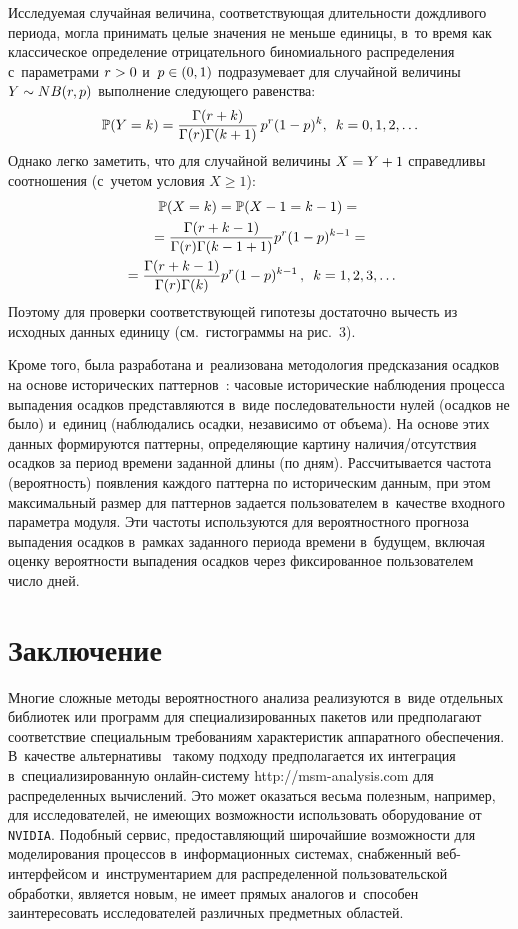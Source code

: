\begin{multicols}{2}
Исследуемая случайная величина, соответствующая длительности 
дождливого периода, могла принимать целые значения не меньше единицы, в~то время 
как классическое определение отрицательного биномиального 
распределения с~па\-ра\-мет\-ра\-ми $r\hm>0$ и~$p\hm\in(0,1)$ подразумевает для 
случайной величины~$Y\hm\sim NB(r,p)$ выполнение следующего равенства:
\begin{equation*}
\mathbb{P}(Y=k)=\displaystyle\frac{\displaystyle \Gamma(r+k)\mathstrut}{\displaystyle \Gamma(r)\Gamma(k+1)\mathstrut}\, p^r (1-p)^{k},
\enskip k=0,1,2,\ldots
\end{equation*}
Однако легко заметить, что для случайной величины $X\hm=Y\hm+1$ справедливы соотношения 
(с~учетом условия $X\geqslant 1$):
\begin{multline*}
\mathbb{P}(X=k)=\mathbb{P}(X-1=k-1)={}\\
{}=\displaystyle\frac{\displaystyle \Gamma(r+k-1)\mathstrut}{\displaystyle \Gamma(r)\Gamma(k-1+1)\mathstrut} p^r
(1-p)^{k-1}={}\\
{}=\displaystyle\frac{\displaystyle \Gamma(r+k-1)\mathstrut}{\displaystyle \Gamma(r)\Gamma(k)\mathstrut} p^r
(1-p)^{k-1}\,, \enskip k=1,2,3,\ldots
\end{multline*}
Поэтому для проверки соответствующей гипотезы достаточно вычесть 
из исходных данных единицу (см.\ гистограммы 
на рис.~3).


Кроме того, была разработана и~реализована методология предсказания осадков 
на основе исторических паттернов~\cite{Gorshenin2016Soft4}: часовые исторические 
наблюдения процесса выпадения осадков представляются в~виде последовательности 
нулей (осадков не было) и~единиц (наблюдались осадки, независимо от объема). 
На основе этих данных формируются паттерны, определяющие картину на\-ли\-чия/от\-сут\-ст\-вия 
осадков за период времени заданной длины (по дням). Рассчитывается частота 
(вероятность) появления каждого паттерна по историческим данным, при этом 
максимальный размер для паттернов задается пользователем в~качестве входного 
параметра модуля. Эти частоты используются для вероятностного прогноза выпадения 
осадков в~рамках заданного периода времени в~будущем, включая оценку вероятности 
выпадения осадков через фиксированное пользователем число дней.

\section{Заключение}

Многие сложные методы вероятностного анализа реализуются в~виде отдельных 
биб\-ли\-о\-тек или программ для специализированных пакетов или предполагают 
соответствие специальным требованиям характеристик аппаратного обеспечения. 
В~качестве альтернативы~\cite{Gorshenin2016Concept} такому подходу предполагается 
их интеграция в~специализированную он\-лайн-сис\-те\-му {\sf http://msm-analysis.com} 
для распределенных вычислений. Это может оказаться весьма полезным, например, 
для исследователей, не имеющих возможности использовать оборудование от \verb"NVIDIA". 
Подобный сервис, предоставляющий широчайшие возможности для моделирования процессов 
в~информационных сис\-те\-мах, снабженный веб-ин\-тер\-фей\-сом и~инструментарием 
для распределенной пользовательской обработки, является новым, не имеет прямых 
аналогов и~способен заинтересовать исследователей различных предметных областей.


\end{multicols}
